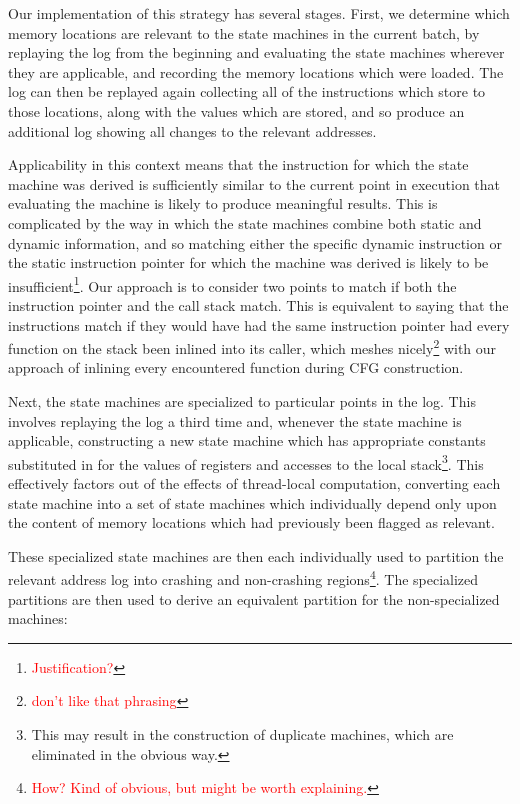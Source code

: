 \documentclass[10pt,twocolumn,preprint,natbib,authoryear]{sigplanconf}
\newcommand{\editorial}[1]{\textcolor{red}{\footnote{\textcolor{red}{#1}}}}
\begin{document}
Our implementation of this strategy has several stages.  First, we
determine which memory locations are relevant to the state machines in
the current batch, by replaying the log from the beginning and
evaluating the state machines wherever they are applicable, and
recording the memory locations which were loaded.  The log can then be
replayed again collecting all of the instructions which store to those
locations, along with the values which are stored, and so produce an
additional log showing all changes to the relevant addresses.

Applicability in this context means that the instruction for which the
state machine was derived is sufficiently similar to the current point
in execution that evaluating the machine is likely to produce
meaningful results.  This is complicated by the way in which the state
machines combine both static and dynamic information, and so matching
either the specific dynamic instruction or the static instruction
pointer for which the machine was derived is likely to be
insufficient\editorial{Justification?}.  Our approach is to consider
two points to match if both the instruction pointer and the call stack
match.  This is equivalent to saying that the instructions match if
they would have had the same instruction pointer had every function on
the stack been inlined into its caller, which meshes
nicely\editorial{don't like that phrasing} with our approach of
inlining every encountered function during CFG construction.

Next, the state machines are specialized to particular points in the
log.  This involves replaying the log a third time and, whenever the
state machine is applicable, constructing a new state machine which
has appropriate constants substituted in for the values of registers
and accesses to the local stack\footnote{This may result in the
  construction of duplicate machines, which are eliminated in the
  obvious way.}.  This effectively factors out of the effects of
thread-local computation, converting each state machine into a set of
state machines which individually depend only upon the content of
memory locations which had previously been flagged as relevant.

These specialized state machines are then each individually used to
partition the relevant address log into crashing and non-crashing
regions\editorial{How?  Kind of obvious, but might be worth
  explaining.}. The specialized partitions are then used to derive an
equivalent partition for the non-specialized machines:
\end{document}
